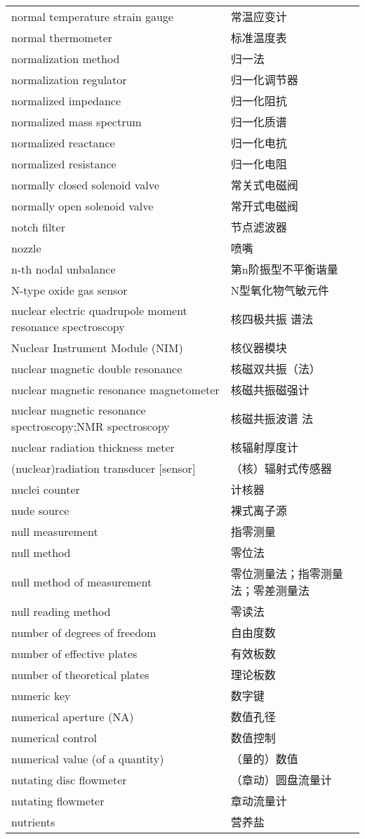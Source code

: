 \documentclass[
]{article}
\begin{document}
\begin{longtable}[]{@{}ll@{}}
normal temperature strain gauge & 常温应变计 \\
normal thermometer & 标准温度表 \\
normalization method & 归一法 \\
normalization regulator & 归一化调节器 \\
normalized impedance & 归一化阻抗 \\
normalized mass spectrum & 归一化质谱 \\
normalized reactance & 归一化电抗 \\
normalized resistance & 归一化电阻 \\
normally closed solenoid valve & 常关式电磁阀 \\
normally open solenoid valve & 常开式电磁阀 \\
notch filter & 节点滤波器 \\
nozzle & 喷嘴 \\
n-th nodal unbalance & 第n阶振型不平衡谐量 \\
N-type oxide gas sensor & N型氧化物气敏元件 \\
nuclear electric quadrupole moment resonance spectroscopy & 核四极共振
谱法 \\
Nuclear Instrument Module (NIM) & 核仪器模块 \\
nuclear magnetic double resonance & 核磁双共振（法） \\
nuclear magnetic resonance magnetometer & 核磁共振磁强计 \\
nuclear magnetic resonance spectroscopy;NMR spectroscopy & 核磁共振波谱
法 \\
nuclear radiation thickness meter & 核辐射厚度计 \\
(nuclear)radiation transducer {[}sensor{]} & （核）辐射式传感器 \\
nuclei counter & 计核器 \\
nude source & 裸式离子源 \\
null measurement & 指零测量 \\
null method & 零位法 \\
null method of measurement & 零位测量法；指零测量法；零差测量法 \\
null reading method & 零读法 \\
number of degrees of freedom & 自由度数 \\
number of effective plates & 有效板数 \\
number of theoretical plates & 理论板数 \\
numeric key & 数字键 \\
numerical aperture (NA) & 数值孔径 \\
numerical control & 数值控制 \\
numerical value (of a quantity) & （量的）数值 \\
nutating disc flowmeter & （章动）圆盘流量计 \\
nutating flowmeter & 章动流量计 \\
nutrients & 营养盐 \\
\bottomrule()
\end{longtable}
\end{document}
